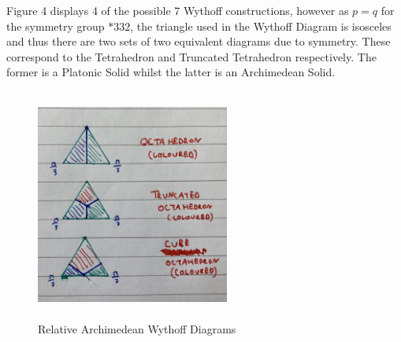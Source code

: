 \documentclass{article}
\begin{document}
Figure 4 displays 4 of the possible 7 Wythoff constructions, however as $p=q$ for the symmetry group $*332$, the triangle used in the Wythoff Diagram is isosceles and thus there are two sets of two equivalent diagrams due to symmetry. These correspond to the Tetrahedron and Truncated Tetrahedron respectively. The former is a Platonic Solid whilst the latter is an Archimedean Solid.

\begin{figure}[htbp]
\centerline{\includegraphics[width=
2.5in, height=3in]{Wythoff2.JPG}}
\caption{Relative Archimedean Wythoff Diagrams}
\label{fig5}
\end{figure}
\end{document}
